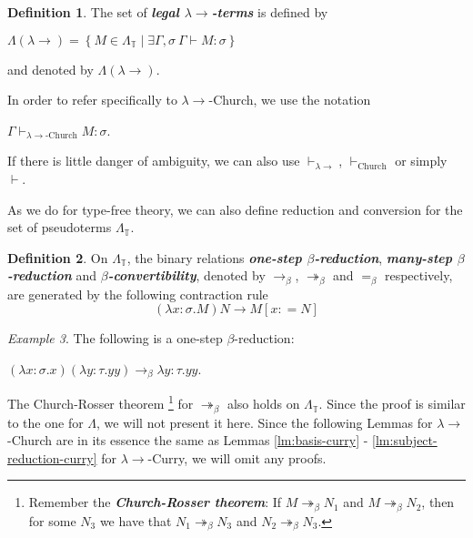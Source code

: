 \documentclass{llncs}
\newcommand{\lambdasystem}[0]{{\lambda}{\rightarrow}}
\newcommand{\myemph}[1]{\textbf{\emph{#1}}}
\theoremstyle{definition}
\newtheorem{mydef}{Definition}
\numberwithin{mydef}{subsection}
\theoremstyle{plain}
\theoremstyle{remark}
\newtheorem{myex}[mydef]{Example}
\begin{document}
	\begin{mydef}
		The set of \myemph{legal $\lambdasystem$-terms} is defined by
		\begin{center}
			$\Lambda {\left( \lambdasystem \right)} = \left \{ M \in \Lambda _{\mathbb{T}} \mid \exists \Gamma , \sigma \ \Gamma \vdash M : \sigma \right \}$
		\end{center}
		and denoted by $\Lambda {\left( \lambdasystem \right)}$. \\
	\end{mydef}
	
	In order to refer specifically to $\lambdasystem$-Church, we use the notation
	\begin{center}
		$\Gamma \vdash _{\lambdasystem \text{-Church}} M : \sigma$.
	\end{center}
	If there is little danger of ambiguity, we can also use $\vdash _{\lambdasystem}$, $\vdash _{\text{Church}}$ or simply $\vdash$.
	
	As we do for type-free theory, we can also define reduction and conversion for the set of pseudoterms $\Lambda _{\mathbb{T}}$.
	
	\begin{mydef}
		On $\Lambda _{\mathbb{T}}$, the binary relations \myemph{one-step $\beta$-reduction}, \myemph{many-step $\beta$-reduction} and \myemph{$\beta$-convertibility}, denoted by $\rightarrow _{\beta}$, $\twoheadrightarrow _{\beta}$ and $= _{\beta}$ respectively, are generated by the following contraction rule
		\begin{equation}
			\left( \lambda x {:} \sigma . M \right) N \rightarrow M {\left[ x : = N \right]} \tag{$\beta$}
		\end{equation}
	\end{mydef}
	
	\begin{myex}
		The following is a one-step $\beta$-reduction:
		\begin{center}
			$\left( \lambda x {:} \sigma . x \right) \left( \lambda y {:} \tau . yy \right) \rightarrow _{\beta} \lambda y {:} \tau . yy$.
		\end{center}
	\end{myex}
	
	The Church-Rosser theorem \footnote{Remember the \myemph{Church-Rosser theorem}: If $M \twoheadrightarrow _{\beta} N _{1}$ and $M \twoheadrightarrow _{\beta} N _{2}$, then for some $N _{3}$ we have that $N _{1} \twoheadrightarrow _{\beta} N _{3}$ and $N _{2} \twoheadrightarrow _{\beta} N _{3}$.} for $\twoheadrightarrow _{\beta}$ also holds on $\Lambda _{\mathbb{T}}$.
	Since the proof is similar to the one for $\Lambda$, we will not present it here.
	Since the following Lemmas for $\lambdasystem$-Church are in its essence the same as Lemmas \ref{lm:basis-curry} - \ref{lm:subject-reduction-curry} for $\lambdasystem$-Curry, we will omit any proofs.
	
\end{document}
